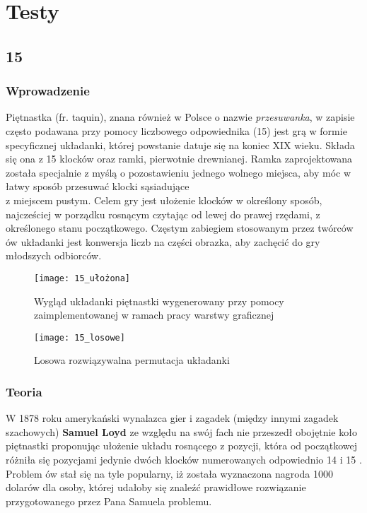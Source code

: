 \chapter{Testy}
\thispagestyle{chapterBeginStyle}

\section{15}
\label{15Test}
    \subsection{Wprowadzenie}
        Piętnastka (fr. taquin), znana również w Polsce o nazwie \textit{przesuwanka}, w zapisie często podawana przy pomocy liczbowego
        odpowiednika (15) jest grą w formie specyficznej
        układanki, której powstanie datuje się na koniec XIX wieku. Składa się ona z 
        15 klocków oraz ramki, pierwotnie drewnianej. Ramka zaprojektowana została specjalnie z myślą
        o pozostawieniu jednego wolnego miejsca, aby móc w łatwy sposób przesuwać klocki sąsiadujące \\
        z miejscem 
        pustym. Celem gry jest ułożenie klocków w określony sposób, najcześciej w porządku rosnącym czytając 
        od lewej do prawej rzędami, z określonego stanu początkowego. Częstym zabiegiem stosowanym przez 
        twórców ów układanki jest konwersja liczb na części obrazka, aby zachęcić do gry młodszych odbiorców.

        \begin{figure}[H]
            \texttt{[image: 15\_ułożona]}
            \centering
            \caption{Wygląd układanki piętnastki wygenerowany przy pomocy zaimplementowanej w ramach pracy warstwy graficznej}
        \end{figure}

        \begin{figure}[H]
            \texttt{[image: 15\_losowe]}
            \centering
            \caption{Losowa rozwiązywalna permutacja układanki}
        \end{figure}

    \subsection{Teoria}
        W 1878 roku amerykański wynalazca gier i zagadek (między innymi zagadek szachowych) \textbf{Samuel Loyd} ze względu na swój fach 
        nie przeszedł obojętnie koło piętnastki proponując ułożenie układu rosnącego z pozycji, która 
        od początkowej różniła się pozycjami jedynie dwóch klocków numerowanych odpowiednio 14 i 15 \cite{FifteenLoydProblem}.
        Problem ów stał się na tyle popularny, iż została wyznaczona nagroda 1000 dolarów dla osoby, której udałoby się 
        znaleźć prawidłowe rozwiązanie przygotowanego przez Pana Samuela problemu.

